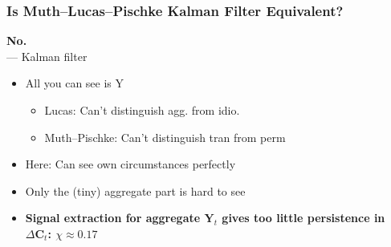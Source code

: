 \documentclass{beamer}\usepackage{dcolumn}
\newcommand{\jbemph}[1]{\textbf{\color{SlideNavy}#1}}
\providecommand{\econtexRoot}{.}
\providecommand{\eq}{\econtexRoot/Equations}
\begin{document}

\begin{frame}[noframenumbering]
\frametitle{Is Muth--Lucas--Pischke Kalman Filter Equivalent?}

\jbemph{No.}\\
\cite{muthOptimal}--\cite{lucas:imperfectInfo}--\cite{pischkeMicroMacro} Kalman filter
\begin{itemize}
\item  All you can see is Y
\begin{itemize}
\item Lucas: Can't distinguish agg. from idio.
\item Muth--Pischke: Can't distinguish tran from perm
\end{itemize}

\item Here: Can see own circumstances perfectly

\item Only the (tiny) aggregate part is hard to see

\item \jbemph{Signal extraction for aggregate $\mathbf{Y}_t$ gives too little persistence in $\Delta \mathbf{C}_t$: $\chi\approx 0.17$}

\end{itemize}

\end{frame}
\end{document}
